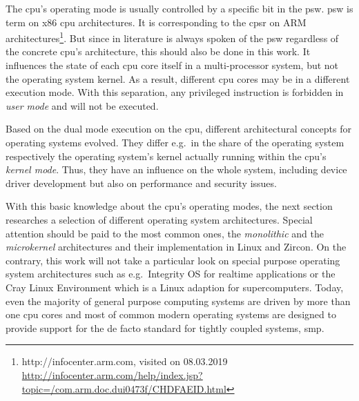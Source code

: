 The \ac{cpu}'s operating mode is usually controlled by a specific bit in the \ac{psw}\cite{tanenbaum-modern-operating-systems}.
\ac{psw} is term on x86 \ac{cpu} architectures. 
It is corresponding to the \ac{cpsr} on ARM architectures\footnote{http://infocenter.arm.com, visited on 08.03.2019 \url{http://infocenter.arm.com/help/index.jsp?topic=/com.arm.doc.dui0473f/CHDFAEID.html}}.
But since in literature is always spoken of the \ac{psw} regardless of the concrete \ac{cpu}'s architecture, this should also be done in this work.
It influences the state of each \ac{cpu} core itself in a multi-processor system, but not the operating system kernel.
As a result, different \ac{cpu} cores may be in a different execution mode\cite{lfd430}.
With this separation, any privileged instruction is forbidden in \textit{user mode} and will not be executed.

Based on the dual mode execution on the \ac{cpu}, different architectural concepts for operating systems evolved.
They differ e.g.\ in the share of the operating system respectively the operating system's kernel actually running within the \ac{cpu}'s \textit{kernel mode}. 
Thus, they have an influence on the whole system, including device driver development but also on performance and security issues.

With this basic knowledge about the \ac{cpu}'s operating modes, the next section researches a selection of different operating system architectures.
Special attention should be paid to the most common ones, the \textit{monolithic} and the \textit{microkernel} architectures and their implementation in Linux and Zircon.
On the contrary, this work will not take a particular look on special purpose operating system architectures such as e.g.\ Integrity OS for realtime applications or the Cray Linux Environment which is a Linux adaption for supercomputers.
Today, even the majority of general purpose computing systems are driven by more than one \ac{cpu} cores and most of common modern operating systems are designed to provide support for the de facto standard for tightly coupled systems, \ac{smp}.


